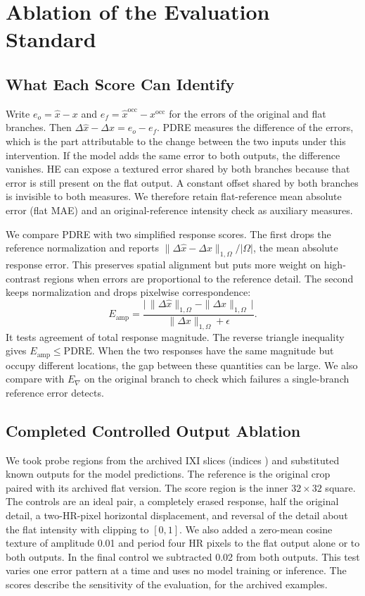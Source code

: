 \documentclass[journal]{IEEEtran}
\begin{document}
\section{Ablation of the Evaluation Standard}
\label{sec:metric-ablations}
\subsection{What Each Score Can Identify}
Write $e_o=\hat{x}-x$ and $e_f=\hat{x}^{\mathrm{occ}}-x^{\mathrm{occ}}$ for the errors of the original and flat branches. Then $\Delta\hat{x}-\Delta x=e_o-e_f$. PDRE measures the difference of the errors, which is the part attributable to the change between the two inputs under this intervention. If the model adds the same error to both outputs, the difference vanishes. HE can expose a textured error shared by both branches because that error is still present on the flat output. A constant offset shared by both branches is invisible to both measures. We therefore retain flat-reference mean absolute error (flat MAE) and an original-reference intensity check as auxiliary measures.

We compare PDRE with two simplified response scores. The first drops the reference normalization and reports $\|\Delta\hat{x}-\Delta x\|_{1,\Omega}/|\Omega|$, the mean absolute response error. This preserves spatial alignment but puts more weight on high-contrast regions when errors are proportional to the reference detail. The second keeps normalization and drops pixelwise correspondence:
\begin{equation}
 E_{\mathrm{amp}} =
 \frac{\big|\,\|\Delta\hat{x}\|_{1,\Omega}-\|\Delta x\|_{1,\Omega}\,\big|}
      {\|\Delta x\|_{1,\Omega}+\epsilon}.
\label{eq:amplitude}
\end{equation}
It tests agreement of total response magnitude. The reverse triangle inequality gives $E_{\mathrm{amp}}\leq\mathrm{PDRE}$. When the two responses have the same magnitude but occupy different locations, the gap between these quantities can be large. We also compare with $E_\nabla$ on the original branch to check which failures a single-branch reference error detects.

\subsection{Completed Controlled Output Ablation}
We took \ControlRegions{} probe regions from the archived IXI slices (indices \ControlIndices{}) and substituted known outputs for the model predictions. The reference is the original crop paired with its archived flat version. The score region is the inner $32\times32$ square. The controls are an ideal pair, a completely erased response, half the original detail, a two-HR-pixel horizontal displacement, and reversal of the detail about the flat intensity with clipping to $[0,1]$. We also added a zero-mean cosine texture of amplitude 0.01 and period four HR pixels to the flat output alone or to both outputs. In the final control we subtracted 0.02 from both outputs. This test varies one error pattern at a time and uses no model training or inference. The scores describe the sensitivity of the evaluation, for the archived examples.
\end{document}
